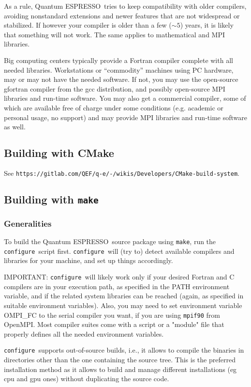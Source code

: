 \documentclass[12pt,a4paper]{article}
\def\qe{{\sc Quantum ESPRESSO}}
\def\configure{\texttt{configure}}
\def\make{\texttt{make}}
\begin{document}
As a rule, \qe\ tries to keep compatibility with older compilers,
avoiding nonstandard extensions and newer features that are not
widespread or stabilized. If however your compiler is older than
a few ($\sim 5$) years, it is likely that something will not work.
The same applies to mathematical and MPI libraries.

Big computing centers typically provide a Fortran compiler complete
with all needed libraries. Workstations or ``commodity'' machines
using PC hardware, may or may not have the needed software. If not,
you may use the open-source gfortran compiler from the gcc distribution,
and possibly open-source MPI libraries and run-time software. You may 
also get a commercial compiler, some of which are available free of charge 
under some conditions (e.g. academic or personal usage, no support) and may 
provide MPI libraries and run-time software as well.

\subsection{Building with CMake}

See \texttt{https://gitlab.com/QEF/q-e/-/wikis/Developers/CMake-build-system}.

\subsection{Building with \make}

\subsubsection{Generalities}
To build the \qe\ source package using \make, run the \configure{}ript first. \configure\ will (try to) detect available compilers and libraries for
your machine, and set up things accordingly.

IMPORTANT: \configure\ will likely work only if your desired Fortran and 
C compilers are in your execution path, as specified in the PATH environment 
variable, and if the related system libraries can be reached (again,
as specified in suitable environment variables). Also, you may need to set 
environment variable OMPI\_FC to the serial compiler you want, if you are
using \texttt{mpif90} from OpenMPI. Most compiler suites come with a script
or a "module" file that properly defines all the needed environment variables. 

\configure\ supports out-of-source builds, i.e., it allows to compile the 
binaries in
directories other than the one containing the source tree. This is the preferred installation
method as it allows to build and manage different installations (eg cpu and gpu ones)
without duplicating the source code.
\end{document}
